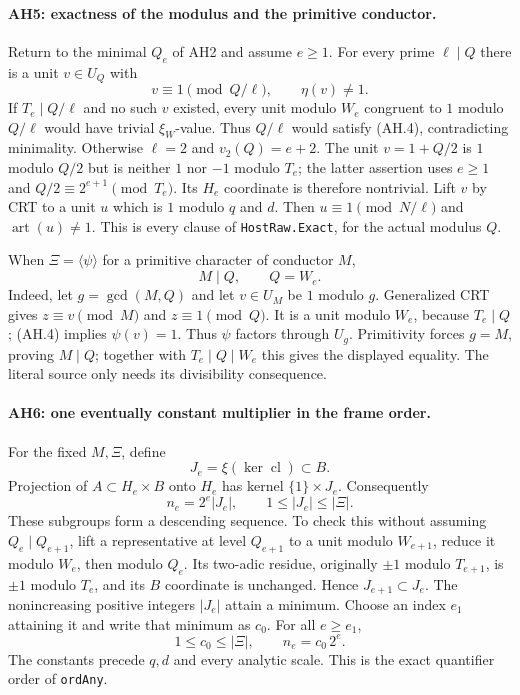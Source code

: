 \paragraph{AH5: exactness of the modulus and the primitive conductor.}
Return to the minimal $Q_e$ of AH2 and assume $e\ge1$.
For every prime $\ell\mid Q$ there is a unit $v\in U_Q$ with
\[
 v\equiv1\pmod{Q/\ell},\qquad \eta(v)\ne1.      \tag{AH.11}
\]
If $T_e\mid Q/\ell$ and no such $v$ existed, every unit modulo $W_e$
congruent to $1$ modulo $Q/\ell$ would have trivial $\xi_W$-value.
Thus $Q/\ell$ would satisfy (AH.4), contradicting minimality.
Otherwise $\ell=2$ and $v_2(Q)=e+2$. The unit $v=1+Q/2$ is $1$ modulo
$Q/2$ but is neither $1$ nor $-1$ modulo $T_e$; the latter assertion uses
$e\ge1$ and $Q/2\equiv2^{e+1}\pmod{T_e}$. Its $H_e$ coordinate is
therefore nontrivial. Lift $v$ by CRT to a unit $u$ which is $1$ modulo
$q$ and $d$. Then $u\equiv1\pmod{N/\ell}$ and
$\operatorname{art}(u)\ne1$. This is every clause of
\texttt{HostRaw.Exact}, for the actual modulus $Q$.

When $\Xi=\langle\psi\rangle$ for a primitive character of conductor $M$,
\[
                    M\mid Q,\qquad Q=W_e.       \tag{AH.12}
\]
Indeed, let $g=\gcd(M,Q)$ and let $v\in U_M$ be $1$ modulo $g$.
Generalized CRT gives $z\equiv v\pmod M$ and $z\equiv1\pmod Q$.
It is a unit modulo $W_e$, because $T_e\mid Q$; (AH.4) implies
$\psi(v)=1$. Thus $\psi$ factors through $U_g$. Primitivity forces
$g=M$, proving $M\mid Q$; together with $T_e\mid Q\mid W_e$ this gives
the displayed equality. The literal source only needs its divisibility
consequence.

\paragraph{AH6: one eventually constant multiplier in the frame order.}
For the fixed $M,\Xi$, define
\[
 J_e=\xi(\ker\operatorname{cl})\subset B.
\]
Projection of $A\subset H_e\times B$ onto $H_e$ has kernel
$\{1\}\times J_e$. Consequently
\[
              n_e=2^e|J_e|,\qquad 1\le|J_e|\le|\Xi|.             \tag{AH.13}
\]
These subgroups form a descending sequence. To check this without assuming
$Q_e\mid Q_{e+1}$, lift a representative at level $Q_{e+1}$ to a unit
modulo $W_{e+1}$, reduce it modulo $W_e$, then modulo $Q_e$.
Its two-adic residue, originally $\pm1$ modulo $T_{e+1}$, is $\pm1$
modulo $T_e$, and its $B$ coordinate is unchanged. Hence
$J_{e+1}\subset J_e$. The nonincreasing positive integers $|J_e|$ attain
a minimum. Choose an index $e_1$ attaining it and write that minimum as
$c_0$. For all $e\ge e_1$,
\[
 1\le c_0\le|\Xi|,\qquad n_e=c_0\,2^e.          \tag{AH.14}
\]
The constants precede $q,d$ and every analytic scale. This is the exact
quantifier order of \texttt{ordAny}.

